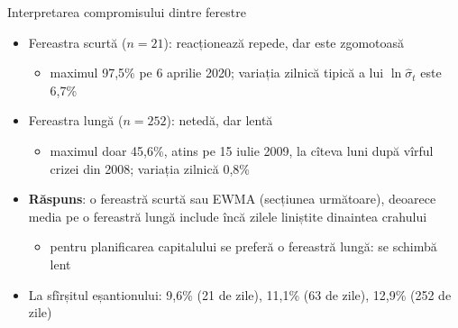 \begin{frame}{Interpretarea compromisului dintre ferestre}
\itemsize{\small}
\begin{itemize}
    \item Fereastra scurtă ($n = 21$): reacționează repede, dar este zgomotoasă
    \begin{itemize}
        \item maximul 97{,}5\% pe 6 aprilie 2020; variația zilnică tipică a lui $\ln\hat\sigma_t$ este 6{,}7\%
    \end{itemize}
    \item Fereastra lungă ($n = 252$): netedă, dar lentă
    \begin{itemize}
        \item maximul doar 45{,}6\%, atins pe 15 iulie 2009, la cîteva luni după vîrful crizei din 2008; variația zilnică 0{,}8\%
    \end{itemize}
    \item \textbf{Răspuns}: o fereastră scurtă sau EWMA (secțiunea următoare), deoarece media pe o fereastră lungă include încă zilele liniștite dinaintea crahului
    \begin{itemize}
        \item pentru planificarea capitalului se preferă o fereastră lungă: se schimbă lent
    \end{itemize}
    \item La sfîrșitul eșantionului: 9{,}6\% (21 de zile), 11{,}1\% (63 de zile), 12{,}9\% (252 de zile)
\end{itemize}
\end{frame}

